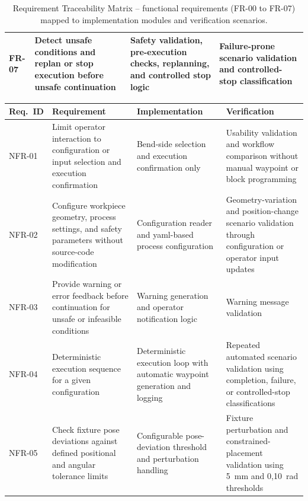 \begin{landscape}
\begin{table}[p]
\begin{tabular}{
L{1.8cm}
L{6.0cm}
L{9.0cm}
L{5.5cm}
}
FR-07 &
Detect unsafe conditions and replan or stop execution before unsafe continuation &
Safety validation, pre-execution checks, replanning, and controlled stop logic &
Failure-prone scenario validation and controlled-stop classification \\

\hline
\end{tabular}

\caption[Requirement Traceability Matrix -- functional requirements]{Requirement Traceability Matrix -- functional requirements (FR-00 to FR-07) mapped to implementation modules and verification scenarios.}
\label{tab:req-traceability-matrix}

\end{table}


\begin{table}[p]
\centering
\normalsize
\setlength{\tabcolsep}{3pt}
\renewcommand{\arraystretch}{1.08}

\begin{tabular}{
L{1.8cm}
L{6.0cm}
L{9.0cm}
L{5.5cm}
}
\hline
\textbf{Req.\ ID} &
\textbf{Requirement} &
\textbf{Implementation} &
\textbf{Verification} \\
\hline

NFR-01 &
Limit operator interaction to configuration or input selection and execution confirmation &
Bend-side selection and execution confirmation only &
Usability validation and workflow comparison without manual waypoint or block programming \\
\hline

NFR-02 &
Configure workpiece geometry, process settings, and safety parameters without source-code modification &
Configuration reader and \acs{yaml}-based process configuration &
Geometry-variation and position-change scenario validation through configuration or operator input updates \\
\hline

NFR-03 &
Provide warning or error feedback before continuation for unsafe or infeasible conditions &
Warning generation and operator notification logic &
Warning message validation \\
\hline

NFR-04 &
Deterministic execution sequence for a given configuration &
Deterministic execution loop with automatic waypoint generation and logging &
Repeated automated scenario validation using completion, failure, or controlled-stop classifications \\
\hline

NFR-05 &
Check fixture pose deviations against defined positional and angular tolerance limits &
Configurable pose-deviation threshold and perturbation handling &
Fixture perturbation and constrained-placement validation using 5~mm and 0{,}10~rad thresholds \\
\hline


\end{tabular}
\end{table}
\end{landscape}
